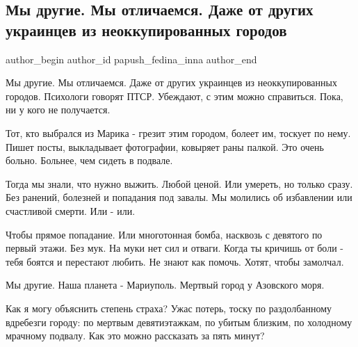  
 
 
 
 
 
\subsection{Мы другие. Мы отличаемся. Даже от других украинцев из неоккупированных городов}
\label{sec:24_05_2022.fb.papush_fedina_inna.1.my_drugie}
 
\ifcmt
 author_begin
   author_id papush_fedina_inna
 author_end
\fi

Мы другие. Мы отличаемся. Даже от других украинцев из неоккупированных городов.
Психологи говорят ПТСР. Убеждают,  с этим можно справиться. Пока, ни у кого не
получается. 

Тот, кто выбрался из Марика - грезит этим городом, болеет им, тоскует по
нему. Пишет посты, выкладывает фотографии, ковыряет раны палкой. Это очень
больно. Больнее, чем сидеть в подвале. 


Тогда мы знали, что нужно выжить. Любой ценой. Или умереть, но только сразу.
Без ранений, болезней и попадания под завалы. Мы молились об избавлении или
счастливой смерти. Или - или. 

Чтобы прямое попадание. Или многотонная бомба, насквозь с девятого по первый
этажи.  Без мук. На муки нет сил и отваги. Когда ты кричишь от боли -  тебя
боятся и перестают любить. Не знают как помочь. Хотят, чтобы замолчал.


Мы другие. Наша планета -  Мариуполь. Мертвый город у Азовского моря.

Как я могу объяснить степень страха?  Ужас потерь, тоску по раздолбанному
вдребезги городу: по  мертвым девятиэтажкам, по убитым  близким, по холодному
мрачному подвалу. Как это можно рассказать за пять минут?

